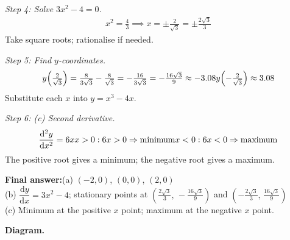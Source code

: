 \documentclass[11pt]{article}
\begin{document}
\textit{Step 4: Solve \( 3x^2 - 4 = 0 \).}
\[\begin{gathered}
x^2 = \tfrac{4}{3} \implies x = \pm \tfrac{2}{\sqrt{3}} = \pm \tfrac{2\sqrt{3}}{3}
\end{gathered}\]
Take square roots; rationalise if needed.

\textit{Step 5: Find \( y \)-coordinates.}
\[\begin{gathered}
y\!\left(\tfrac{2}{\sqrt{3}}\right) = \tfrac{8}{3\sqrt{3}} - \tfrac{8}{\sqrt{3}} = -\tfrac{16}{3\sqrt{3}} = -\tfrac{16\sqrt{3}}{9} \approx -3.08 \newline y\!\left(-\tfrac{2}{\sqrt{3}}\right) \approx 3.08
\end{gathered}\]
Substitute each \( x \) into \( y = x^3 - 4x \).

\textit{Step 6: (c) Second derivative.}
\[\begin{gathered}
\frac{\mathrm{d}^2y}{\mathrm{d}x^2} = 6x \newline x > 0: 6x > 0 \Rightarrow \text{minimum} \newline x < 0: 6x < 0 \Rightarrow \text{maximum}
\end{gathered}\]
The positive root gives a minimum; the negative root gives a maximum.

\begin{answerbox}
\textbf{Final answer:}\quad (a) \(\displaystyle  (-2,0) \), \(\displaystyle  (0,0) \), \(\displaystyle  (2,0) \) \\[3pt]  (b) \(\displaystyle  \dfrac{\mathrm{d}y}{\mathrm{d}x} = 3x^2 - 4 \); stationary points at \(\displaystyle  \left(\tfrac{2\sqrt{3}}{3},\, -\tfrac{16\sqrt{3}}{9}\right) \) and \(\displaystyle  \left(-\tfrac{2\sqrt{3}}{3},\, \tfrac{16\sqrt{3}}{9}\right) \) \\[3pt]  (c) Minimum at the positive \(\displaystyle  x \) point; maximum at the negative \(\displaystyle  x \) point.
\end{answerbox}
\textbf{Diagram.}
\end{document}
